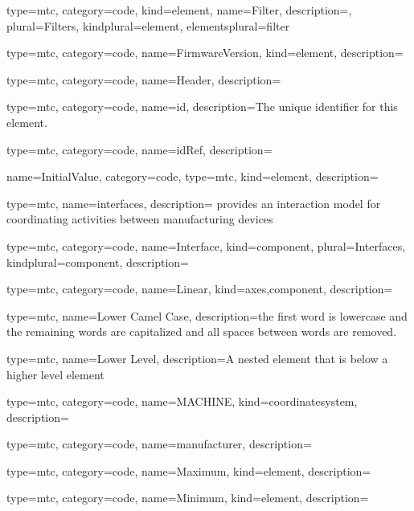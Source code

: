 {
  type=mtc,
  category=code,
  kind={element},
  name={Filter},
  description={},
  plural={Filters},
  kindplural={element},
  elementsplural={\gls{filter}}
}


{
  type=mtc,
  category=code,
  name={FirmwareVersion},
  kind={element},
  description={}
}


{
  type=mtc,
  category=code,
  name={Header},
  description={}
}


{
  type=mtc,
  category=code,
  name={id},
  description={The unique identifier for this element.}
}


{
  type=mtc,
  category=code,
  name={idRef},
  description={}
}


{
  name={InitialValue},
  category=code,
  type=mtc,
  kind={element},
  description={}
}


{
  type=mtc,
  name=interfaces,
  description={ provides an interaction model for coordinating activities between manufacturing devices}
}


{
  type=mtc,
  category=code,
  name={Interface},
  kind={component},
  plural={Interfaces},
  kindplural={component},
  description={}
}


{
  type=mtc,
  category=code,
  name={Linear},
  kind={axes,component},
  description={}
}


{
  type=mtc,
  name={Lower Camel Case},
  description={the first word is lowercase and the remaining words are capitalized and all spaces between words are removed.}
}


{
  type=mtc,
  name={Lower Level},
  description={A nested element that is below a higher level element}
}


{
  type=mtc,
  category=code,
  name={MACHINE},
  kind={coordinatesystem},
  description={}
}


{
  type=mtc,
  category=code,
  name={manufacturer},
  description={}
}


{
  type=mtc,
  category=code,
  name={Maximum},
  kind={element},
  description={}
}


{
  type=mtc,
  category=code,
  name={Minimum},
  kind={element},
  description={}
}


